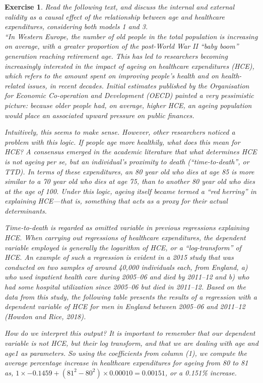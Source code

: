 \documentclass{article}
\newtheorem{exercise}[theorem]{Exercise}
\begin{document}
\begin{exercise}%
Read the following text, and discuss the internal and external validity as a causal effect of the relationship between age and healthcare expenditures, considering both models 1 and 3.\\[1em]

``In Western Europe, the number of old people in the total population is increasing on average, with a greater proportion of the post-World War II “baby boom” generation reaching retirement age. This has led to researchers becoming increasingly interested in the impact of ageing on healthcare expenditures (HCE), which refers to the amount spent on improving people’s health and on health-related issues, in recent decades. Initial estimates published by the Organisation for Economic Co-operation and Development (OECD) painted a very pessimistic picture: because older people had, on average, higher HCE, an ageing population would place an associated upward pressure on public finances.

Intuitively, this seems to make sense. However, other researchers noticed a problem with this logic. If people age more healthily, what does this mean for HCE? A consensus emerged in the academic literature that what determines HCE is not ageing per se, but an individual’s proximity to death (“time-to-death”, or TTD). In terms of these expenditures, an 80 year old who dies at age 85 is more similar to a 70 year old who dies at age 75, than to another 80 year old who dies at the age of 100. Under this logic, ageing itself became termed a “red herring” in explaining HCE—that is, something that acts as a proxy for their actual determinants.

Time-to-death is regarded as omitted variable in previous regressions explaining HCE. When carrying out regressions of healthcare expenditures, the dependent variable employed is generally the logarithm of HCE, or a “log-transform” of HCE. An example of such a regression is evident in a 2015 study that was conducted on two samples of around 40,000 individuals each, from England, a) who used inpatient health care during 2005–06 and died by 2011–12 and b) who had some hospital utilization since 2005–06 but died in 2011–12. Based on the data from this study, the following table presents the results of a regression with a dependent variable of HCE for men in England between 2005–06 and 2011–12 (Howdon and Rice, 2018).

How do we interpret this output? It is important to remember that our dependent variable is not HCE, but their log transform, and that we are dealing with age and age1 as parameters. So using the coefficients from column (1), we compute the average percentage increase in healthcare expenditures for ageing from 80 to 81 as, $1 \times -0.1459 + (81^2 - 80^2) \times 0.00010 = 0.00151$, or a 0.151\% increase.


\end{exercise}
\end{document}
